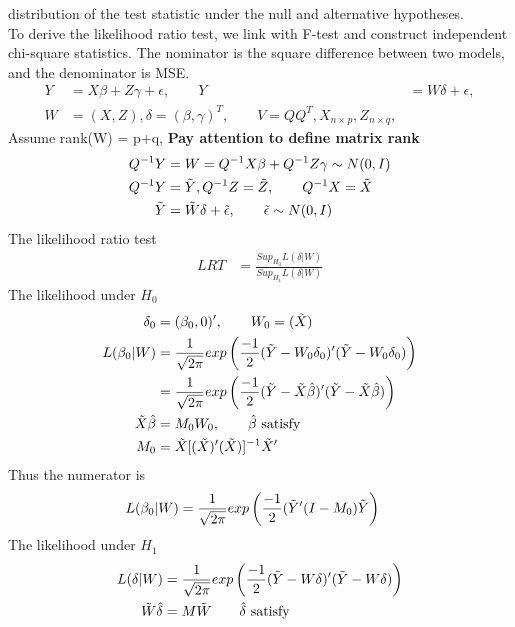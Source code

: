 \begin{itemize}
distribution of the test statistic under the null and alternative hypotheses.\\
To derive the likelihood ratio test, we link with F-test and construct independent chi-square statistics. The nominator is the square difference between two models, and the denominator is MSE.\\
\begin{align*}
Y &= X\beta + Z\gamma + \epsilon, \qquad Y&= W\delta + \epsilon, \\
W &= (X, Z), \delta = (\beta, \gamma)^T, \qquad V = Q Q^{T}, X_{n \times p}, Z_{n \times q}, 
\end{align*}
Assume rank(W) = p+q, \textbf{Pay attention to define matrix rank}
\begin{align*}
Q^{-1}Y &= W = Q^{-1}X \beta + Q^{-1}Z \gamma \sim N(0, I) \\
Q^{-1}Y &= \Tilde{Y}, Q^{-1}Z = \Tilde{Z}, \qquad Q^{-1}X = \Tilde{X}\\
\Tilde{Y} &= \Tilde{W} \delta + \Tilde{\epsilon},  \qquad \Tilde{\epsilon} \sim N(0,I)
\end{align*}
The likelihood ratio test
\begin{align*}
LRT &= \frac{Sup_{H_0} L(\delta| W)}{Sup_{H_1}L(\delta| W)} 
\end{align*}
The likelihood under $H_0$
\begin{align*}
\delta_0 &= (\beta_0, 0)', \qquad W_0 = (\Tilde{X}) \\
L(\beta_0|W) &=\frac{1}{\sqrt{2\pi}} exp \left(\frac{-1}{2} (\Tilde{Y} - W_0\delta_0)'(\Tilde{Y} - W_0\delta_0) \right) \\
&= \frac{1}{\sqrt{2\pi}} exp \left(\frac{-1}{2} (\Tilde{Y} - \Tilde{X}\hat{\beta})'(\Tilde{Y} - \Tilde{X}\hat{\beta}) \right)\\
\Tilde{X}\hat{\beta} &= M_0 W_0, \qquad \hat{\beta} \text{ satisfy}\\
M_0 &= \Tilde{X}[(\Tilde{X})'(\Tilde{X})]^{-1}\Tilde{X}' 
\end{align*}
Thus the numerator is 
\begin{align*}
L(\beta_0|W) &= \frac{1}{\sqrt{2\pi}} exp \left(\frac{-1}{2} (\Tilde{Y}' (I- M_0) \Tilde{Y} \right)
\end{align*}
The likelihood under $H_1$
\begin{align*}
L(\delta|W) &=\frac{1}{\sqrt{2\pi}} exp \left(\frac{-1}{2} (\Tilde{Y} - W\delta)'(\Tilde{Y} - W\delta) \right)\\
\Tilde{W} \hat{\delta} &= M \Tilde{W} \qquad \hat{\delta} \text{ satisfy}\\

\end{align*}
\end{itemize}

